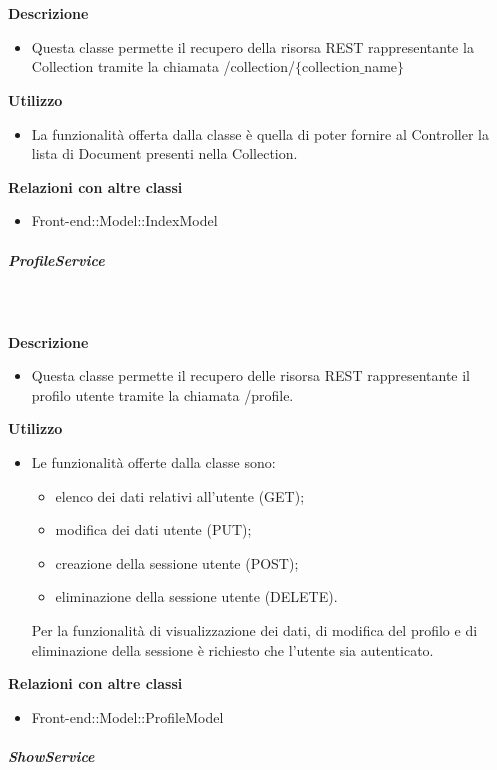 				\textbf{\\ \\ Descrizione} 
					\begin{itemize}
						\item[] Questa classe permette il recupero della risorsa REST rappresentante la Collection tramite la chiamata  /collection/$\{$collection$\_$name$\}$
					\end{itemize}      
				\textbf{Utilizzo}  
					\begin{itemize}
						\item[] La  funzionalità offerta dalla classe è quella di poter fornire al Controller la lista di Document presenti nella Collection.
					\end{itemize}
					\textbf{Relazioni con altre classi}
					\begin{itemize}
							\item{Front-end::Model::IndexModel}
					\end{itemize}
			\subparagraph{ProfileService}
				
				\textbf{\\ \\ Descrizione} 
					\begin{itemize}
						\item[] Questa classe permette il recupero delle risorsa REST rappresentante il profilo utente tramite la chiamata /profile.
					\end{itemize}      
				\textbf{Utilizzo}  
					\begin{itemize}
						\item[] Le funzionalità offerte dalla classe sono:
\begin{itemize}
\item elenco dei dati relativi all'utente (GET);
\item modifica dei dati utente (PUT);
\item creazione della sessione utente (POST);
\item eliminazione della sessione utente (DELETE).
\end{itemize}

Per la funzionalità di visualizzazione dei dati, di modifica del profilo e di eliminazione della sessione è richiesto che l'utente sia autenticato.
					\end{itemize}
					\textbf{Relazioni con altre classi}
					\begin{itemize}
							\item{Front-end::Model::ProfileModel}
					\end{itemize}
			\subparagraph{ShowService}
				
